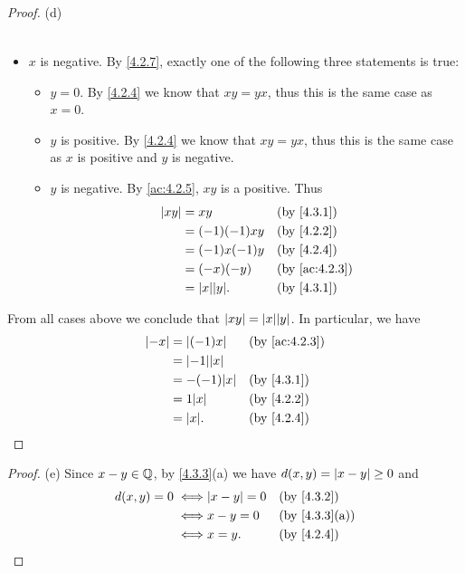 \begin{proof}{(d)}
\begin{itemize}
\begin{itemize}
\begin{align*}
                  \end{align*}
          \end{itemize}
    \item \(x\) is negative.
          By \cref{4.2.7}, exactly one of the following three statements is true:
          \begin{itemize}
            \item \(y = 0\).
                  By \cref{4.2.4} we know that \(xy = yx\), thus this is the same case as \(x = 0\).
            \item \(y\) is positive.
                  By \cref{4.2.4} we know that \(xy = yx\), thus this is the same case as \(x\) is positive and \(y\) is negative.
            \item \(y\) is negative.
                  By \cref{ac:4.2.5}, \(xy\) is a positive.
                  Thus
                  \begin{align*}
                    \abs{xy} & = xy               &  & \text{(by \cref{4.3.1})}    \\
                             & = (-1)(-1)xy       &  & \text{(by \cref{4.2.2})}    \\
                             & = (-1)x(-1)y       &  & \text{(by \cref{4.2.4})}    \\
                             & = (-x)(-y)         &  & \text{(by \cref{ac:4.2.3})} \\
                             & = \abs{x} \abs{y}. &  & \text{(by \cref{4.3.1})}
                  \end{align*}
          \end{itemize}
  \end{itemize}
  From all cases above we conclude that \(\abs{xy} = \abs{x} \abs{y}\).
  In particular, we have
  \begin{align*}
    \abs{-x} & = \abs{(-1)x}      &  & \text{(by \cref{ac:4.2.3})} \\
             & = \abs{-1} \abs{x}                                  \\
             & = -(-1) \abs{x}    &  & \text{(by \cref{4.3.1})}    \\
             & = 1 \abs{x}        &  & \text{(by \cref{4.2.2})}    \\
             & = \abs{x}.         &  & \text{(by \cref{4.2.4})}
  \end{align*}
\end{proof}

\begin{proof}{(e)}
  Since \(x - y \in \mathbb{Q}\), by \cref{4.3.3}(a) we have \(d(x, y) = \left\lvert x - y\right\rvert \geq 0\) and
  \begin{align*}
    d(x, y) = 0
    \iff & \abs{x - y} = 0 &  & \text{(by \cref{4.3.2})}    \\
    \iff & x - y = 0       &  & \text{(by \cref{4.3.3}(a))} \\
    \iff & x = y.          &  & \text{(by \cref{4.2.4})}
  \end{align*}
\end{proof}

